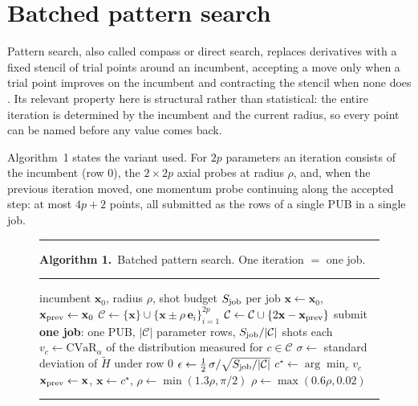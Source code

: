 \documentclass[aps,prx,preprint,superscriptaddress,nofootinbib,longbibliography]{revtex4-2}
\newcommand{\CVaR}{\mathrm{CVaR}}
\begin{document}
\section{Batched pattern search}
\label{sec:optimizer}

Pattern search, also called compass or direct search, replaces derivatives with a fixed
stencil of trial points around an incumbent, accepting a move only when a trial point
improves on the incumbent and contracting the stencil when none does
\cite{torczon1997convergence,kolda2003directsearch}. Its relevant property here is
structural rather than statistical: the entire iteration is determined by the incumbent and
the current radius, so every point can be named before any value comes back.

Algorithm~1 states the variant used. For $2p$ parameters an iteration consists of
the incumbent (row $0$), the $2\times 2p$ axial probes at radius $\rho$, and, when the
previous iteration moved, one momentum probe continuing along the accepted step: at most
$4p+2$ points, all submitted as the rows of a single PUB in a single job.

\begin{figure}[t]
\vspace{2pt}\hrule\vspace{3pt}
\noindent\textbf{Algorithm 1.}~Batched pattern search. One iteration $=$ one job.
\vspace{2pt}\hrule\vspace{4pt}
\begin{algorithmic}[1]
\Require incumbent $\mathbf x_0$, radius $\rho$, shot budget $S_{\rm job}$ per job
\State $\mathbf x \gets \mathbf x_0$, \; $\mathbf x_{\rm prev} \gets \mathbf x_0$
 
  \State $\mathcal{C} \gets \{\mathbf x\} \cup
         \{\mathbf x \pm \rho\,\mathbf e_i\}_{i=1}^{2p}$
     \State $\mathcal{C} \gets \mathcal{C} \cup
            \{2\mathbf x - \mathbf x_{\rm prev}\}$ 
  \EndIf
  \State submit \textbf{one job}: one PUB, $|\mathcal{C}|$ parameter rows,
         $S_{\rm job}/|\mathcal{C}|$ shots each
  \State $v_c \gets \CVaR_\alpha$ of the distribution measured for $c\in\mathcal{C}$
  \State $\sigma \gets$ standard deviation of $\tilde H$ under row $0$
  \State $\epsilon \gets \tfrac12\,\sigma/\sqrt{S_{\rm job}/|\mathcal{C}|}$
  \State $c^\star \gets \arg\min_{c} v_c$
     \State $\mathbf x_{\rm prev} \gets \mathbf x$, \;
            $\mathbf x \gets c^\star$, \;
            $\rho \gets \min(1.3\rho, \pi/2)$
  \Else
     \State $\rho \gets \max(0.6\rho, 0.02)$
  \EndIf
\EndFor
\end{algorithmic}
\vspace{2pt}\hrule\vspace{2pt}
\end{figure}
\end{document}
